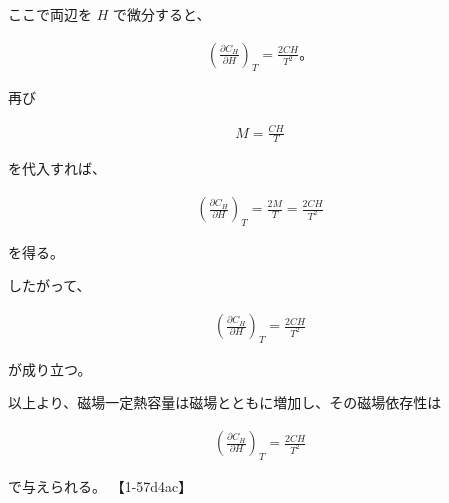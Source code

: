 \documentclass[platex,dvipdfmx,a4paper]{jsarticle}
\begin{document}
ここで両辺を $H$ で微分すると、

\begin{align*}
\left(
\frac{\partial C_H}{\partial H}
\right)_T
=
\frac{2CH}{T^2}。
\end{align*}

再び

\begin{align*}
M=\frac{CH}{T}
\end{align*}

を代入すれば、

\begin{align*}
\left(
\frac{\partial C_H}{\partial H}
\right)_T
=
\frac{2M}{T}
=
\frac{2CH}{T^2}
\end{align*}

を得る。

したがって、

\begin{align*}
\left(
\frac{\partial C_H}{\partial H}
\right)_T
=
\frac{2CH}{T^2}
\end{align*}

が成り立つ。

以上より、磁場一定熱容量は磁場とともに増加し、その磁場依存性は

\begin{align*}
\left(
\frac{\partial C_H}{\partial H}
\right)_T
=
\frac{2CH}{T^2}
\end{align*}

で与えられる。 【1-57d4ac】
\end{document}
